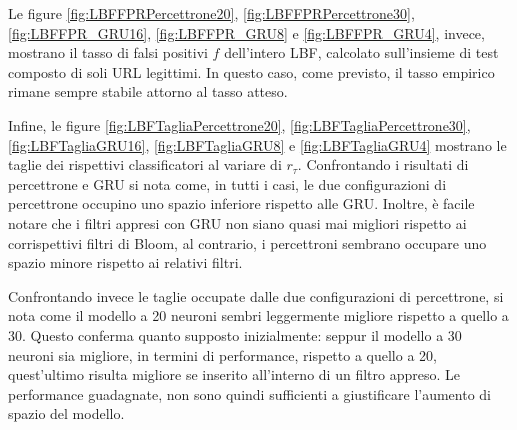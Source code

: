 \documentclass[../../main.tex]{subfiles}
\begin{document}
    Le figure \ref{fig:LBFFPRPercettrone20}, \ref{fig:LBFFPRPercettrone30}, \ref{fig:LBFFPR_GRU16}, \ref{fig:LBFFPR_GRU8} e \ref{fig:LBFFPR_GRU4}, invece, mostrano il tasso di falsi positivi $f$ dell'intero LBF, calcolato sull'insieme di test composto di soli URL legittimi. In questo caso, come previsto, il tasso empirico rimane sempre stabile attorno al tasso atteso.

    Infine, le figure \ref{fig:LBFTagliaPercettrone20}, \ref{fig:LBFTagliaPercettrone30}, \ref{fig:LBFTagliaGRU16}, \ref{fig:LBFTagliaGRU8} e \ref{fig:LBFTagliaGRU4} mostrano le taglie dei rispettivi classificatori al variare di $r_{\tau}$. Confrontando i risultati di percettrone e GRU si nota come, in tutti i casi, le due configurazioni di percettrone occupino uno spazio inferiore rispetto alle GRU. Inoltre, è facile notare che i filtri appresi con GRU non siano quasi mai migliori rispetto ai corrispettivi filtri di Bloom, al contrario, i percettroni sembrano occupare uno spazio minore rispetto ai relativi filtri. 

    Confrontando invece le taglie occupate dalle due configurazioni di percettrone, si nota come il modello a 20 neuroni sembri leggermente migliore rispetto a quello a 30. Questo conferma quanto supposto inizialmente: seppur il modello a 30 neuroni sia migliore, in termini di performance, rispetto a quello a 20, quest'ultimo risulta migliore se inserito all'interno di un filtro appreso. Le performance guadagnate, non sono quindi sufficienti a giustificare l'aumento di spazio del modello.
\end{document}
